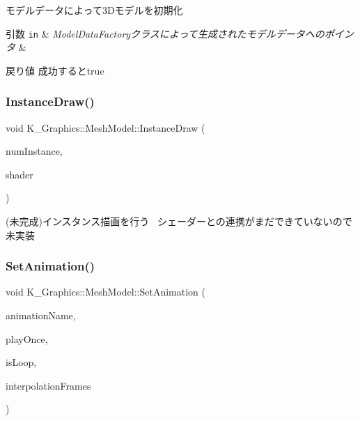 モデルデータによって3\+Dモデルを初期化 


\begin{DoxyParams}[1]{引数}
\mbox{\tt in}  & {\em Model\+Data\+Factoryクラスによって生成されたモデルデータへのポインタ} & \\
\hline
\end{DoxyParams}
\begin{DoxyReturn}{戻り値}
成功するとtrue 
\end{DoxyReturn}
\mbox{\label{class_k___graphics_1_1_mesh_model_ad6da27db2ea78c8b7b531707973d33f1}} 
\subsubsection{\texorpdfstring{Instance\+Draw()}{InstanceDraw()}}
{\footnotesize\ttfamily void K\+\_\+\+Graphics\+::\+Mesh\+Model\+::\+Instance\+Draw (\begin{DoxyParamCaption}\item[{int}]{num\+Instance,  }\item[{\mbox{\hyperlink{class_k___graphics_1_1_shader_class}{Shader\+Class}} $\ast$}]{shader }\end{DoxyParamCaption})}



(未完成)インスタンス描画を行う~\newline
シェーダーとの連携がまだできていないので未実装 

\mbox{\label{class_k___graphics_1_1_mesh_model_afd9c3efeb690b8acd03a83aa8382f22c}} 
\subsubsection{\texorpdfstring{Set\+Animation()}{SetAnimation()}}
{\footnotesize\ttfamily void K\+\_\+\+Graphics\+::\+Mesh\+Model\+::\+Set\+Animation (\begin{DoxyParamCaption}\item[{const std\+::string \&}]{animation\+Name,  }\item[{bool}]{play\+Once,  }\item[{bool}]{is\+Loop,  }\item[{int}]{interpolation\+Frames }\end{DoxyParamCaption})}



